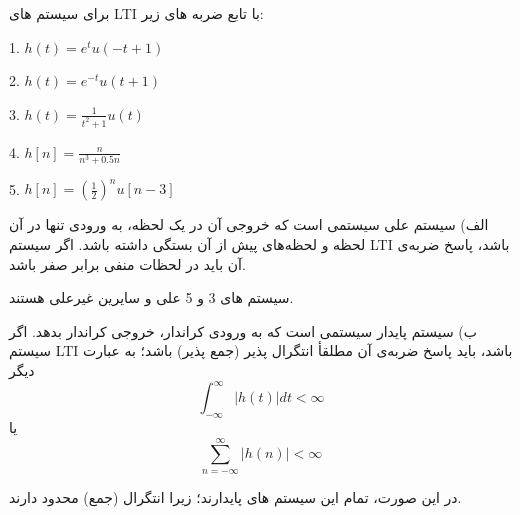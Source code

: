\documentclass{article}
\begin{document}
%

\large

برای سیستم های LTI با تابع ضربه های زیر:

1.
$h(t)=e^{t}u(-t+1)$

2.
$h(t)=e^{-t}u(t+1)$

3.
$h(t)=\frac{1}{t^2+1}u(t)$

4.
$h[n]=\frac{n}{n^3+0.5n}$

5.
$h[n]=(\frac{1}{2})^nu[n-3]$



الف) سیستم علی سیستمی است که خروجی آن در یک لحظه، به ورودی تنها در آن لحظه و لحظه‌های پیش از آن بستگی داشته باشد. اگر سیستم LTI باشد، پاسخ ضربه‌ی آن باید در لحظات منفی برابر صفر باشد.

سیستم های 3 و 5 علی و سایرین غیرعلی هستند.

ب) سیستم پایدار سیستمی است که به ورودی کراندار، خروجی کراندار بدهد. اگر سیستم LTI باشد، باید پاسخ ضربه‌ی آن مطلقأ انتگرال پذیر (جمع پذیر) باشد؛ به عبارت دیگر
$$
\int_{-\infty}^\infty |h(t)|dt<\infty
$$
یا
$$
\sum_{n=-\infty}^\infty |h(n)|<\infty
$$

در این صورت، تمام این سیستم های پایدارند؛ زیرا انتگرال (جمع) محدود دارند.
\end{document}
